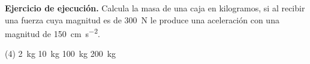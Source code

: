 \documentclass[12pt, letter]{exam}
\begin{document}
\begin{questions}

    \question \label{Ejercicio_10} \textbf{Ejercicio de ejecución. } Calcula la masa de una caja en kilogramos, si al recibir una fuerza cuya magnitud es de \SI{300}{\newton} le produce una aceleración con una magnitud de \SI{150}{\centi\meter\per\square\second}.
    \begin{tasks}(4)
        \task \SI{2}{\kilo\gram}
        \task \SI{10}{\kilo\gram}
        \task \SI{100}{\kilo\gram}
        \task \SI{200}{\kilo\gram}
    \end{tasks}


\end{questions}
\end{document}
